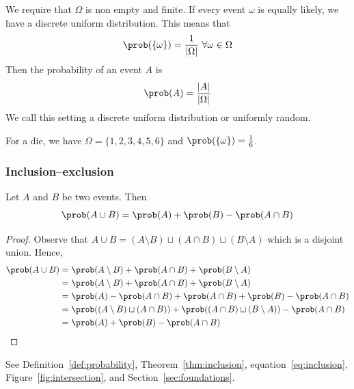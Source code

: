 We require that $\Omega$ is non empty and finite. If every event $\omega$ is equally likely, we have a discrete uniform distribution. This means that
\[\prob(\{\omega\})=\frac{1}{|\Omega|}\ \forall\omega\in\Omega\]
Then the probability of an event $A$ is
\[\prob(A)=\frac{|A|}{|\Omega|}\]
We call this setting a discrete uniform distribution or uniformly random.


\begin{example}
For a die, we have $\Omega=\{1,2,3,4,5,6\}$ and $\prob(\{\omega\})=\frac{1}{6}$.
\end{example}
\subsubsection{Inclusion--exclusion}
\begin{theorem}\label{thm:inclusion}
Let $A$ and $B$ be two events. Then
\begin{equation}\label{eq:inclusion}
\prob(A\cup B)=\prob(A)+\prob(B)-\prob(A\cap B)
\end{equation}
\end{theorem}
\begin{proof}
Observe that $A\cup B=(A\setminus B)\sqcup(A\cap B)\sqcup(B\setminus A)$ which is a disjoint union. Hence,
\begin{align*}
    \prob(A\cup B)&=\prob(A\setminus B)+\prob(A\cap B)+\prob(B\setminus A)\\
    &=\prob(A\setminus B)+\prob(A\cap B)+\prob(B\setminus A)\\
    &=\prob(A)-\prob(A\cap B)+\prob(A\cap B)+\prob(B)-\prob(A\cap B)\\
    &=\prob((A\setminus B)\sqcup(A\cap B))+\prob((A\cap B)\sqcup(B\setminus A))-\prob(A\cap B)\\
    &=\prob(A)+\prob(B)-\prob(A\cap B)
\end{align*}
\end{proof}
See Definition~\ref{def:probability}, Theorem~\ref{thm:inclusion},
equation~\eqref{eq:inclusion}, Figure~\ref{fig:intersection},
and Section~\ref{sec:foundations}.
